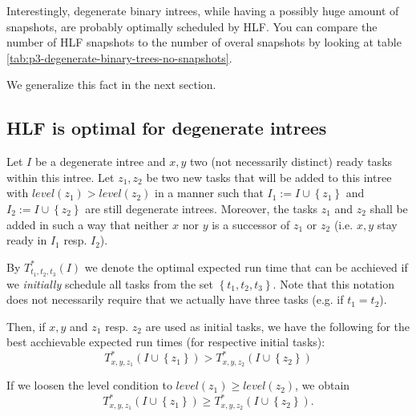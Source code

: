 Interestingly, degenerate binary intrees, while having a possibly huge amount of snapshots, are probably optimally scheduled by HLF. You can compare the number of HLF snapshots to the number of overal snapshots by looking at table \ref{tab:p3-degenerate-binary-trees-no-snapshots}.

We generalize this fact in the next section.

\subsection{HLF is optimal for degenerate intrees}
\label{sec:p3-degenerate-intrees-hlf-optimal}

\begin{lemma}
  \label{lem:p3-adding-tasks-level-keep-scheduled-same-inequality}
  Let $I$ be a degenerate intree and $x, y$ two (not necessarily distinct) ready tasks within this intree. Let $z_1, z_2$ be two new tasks that will be added to this intree with $level(z_1) > level(z_2)$ in a manner such that $I_1:=I\cup\left\{ z_1 \right\}$ and $I_2:=I\cup\left\{ z_2 \right\}$ are still degenerate intrees. Moreover, the tasks $z_1$ and $z_2$ shall be added in such a way that neither $x$ nor $y$ is a successor of $z_1$ or $z_2$ (i.e. $x,y$ stay ready in $I_1$ resp. $I_2$). 
  
  By $T^*_{t_1,t_2,t_3}(I)$ we denote the optimal expected run time that can be acchieved if we \emph{initially} schedule all tasks from the set $\left\{ t_1,t_2,t_3 \right\}$.  Note that this notation does not necessarily require that we actually have three tasks (e.g. if $t_1=t_2$).
  
  Then, if $x,y$ and $z_1$ resp. $z_2$ are used as initial tasks, we have the following for the best acchievable expected run times (for respective initial tasks):
  \begin{equation}
    \label{eq:lemma-p3-adding-tasks-level-keep-scheduled-same-inequality}
    T^{*}_{x,y,z_1}\left(I\cup\left\{ z_1 \right\}\right) > T^{*}_{x,y,z_2}\left( I\cup\left\{ z_2 \right\} \right)
  \end{equation}

  If we loosen the level condition to $level(z_1)\geq level(z_2)$, we obtain
  \begin{equation*}
    T^{*}_{x,y,z_1}\left(I\cup\left\{ z_1 \right\}\right) \geq T^{*}_{x,y,z_2}\left( I\cup\left\{ z_2 \right\} \right).
  \end{equation*}
\end{lemma}

